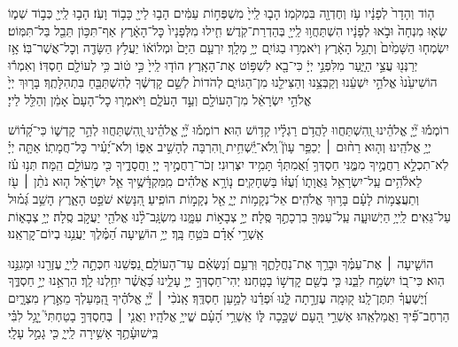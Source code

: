 ה֤וֹד וְהָדָר֙ לְפָנָ֔יו עֹ֥ז וְחֶדְוָ֖ה בִּמְקֹמֽוֹ׃
הָב֤וּ לַֽייָ֙ מִשְׁפְּח֣וֹת עַמִּ֔ים הָב֥וּ לַייָ֖ כָּב֥וֹד וָעֹֽז׃
הָב֥וּ לַֽייָ֖ כְּב֣וֹד שְׁמ֑וֹ שְׂא֤וּ מִנְחָה֙ וּבֹ֣אוּ לְפָנָ֔יו
הִשְׁתַּחֲו֥וּ לַֽייָ֖ בְּהַדְרַת־קֹֽדֶשׁ׃ חִ֤ילוּ מִלְּפָנָיו֙ כׇּל־הָאָ֔רֶץ
אַף־תִּכּ֥וֹן תֵּבֵ֖ל בַּל־תִּמּֽוֹט׃ יִשְׂמְח֤וּ הַשָּׁמַ֙יִם֙ וְתָגֵ֣ל הָאָ֔רֶץ
וְיֹאמְר֥וּ בַגּוֹיִ֖ם יְיָ֥ מָלָֽךְ׃ יִרְעַ֤ם הַיָּם֙ וּמְלוֹא֔וֹ
יַעֲלֹ֥ץ הַשָּׂדֶ֖ה וְכׇל־אֲשֶׁר־בּֽוֹ׃ אָ֥ז יְרַנְּנ֖וּ עֲצֵ֣י הַיָּ֑עַר
מִלִּפְנֵ֣י יְיָ֔ כִּי־בָ֖א לִשְׁפּ֥וֹט אֶת־הָאָֽרֶץ׃ הוֹד֤וּ לַֽייָ֙ כִּ֣י ט֔וֹב
כִּ֥י לְעוֹלָ֖ם חַסְדּֽוֹ׃ וְאִמְר֕וּ הוֹשִׁיעֵ֙נוּ֙ אֱלֹהֵ֣י יִשְׁעֵ֔נוּ
וְקַבְּצֵ֥נוּ וְהַצִּילֵ֖נוּ מִן־הַגּוֹיִ֑ם לְהֹדוֹת֙ לְשֵׁ֣ם קׇדְשֶׁ֔ךָ
לְהִשְׁתַּבֵּ֖חַ בִּתְהִלָּתֶֽךָ׃ בָּר֤וּךְ יְיָ֙ אֱלֹהֵ֣י יִשְׂרָאֵ֔ל
מִן־הָעוֹלָ֖ם וְעַ֣ד הָעֹלָ֑ם וַיֹּאמְר֤וּ כׇל־הָעָם֙ אָמֵ֔ן וְהַלֵּ֖ל לַייָ׃\\

\negline

%
רוֹמְמ֡וּ יְ֘יָ֤ אֱלֹהֵ֗ינוּ וְֽ֭הִשְׁתַּחֲווּ לַהֲדֹ֥ם רַגְלָ֗יו קָד֥וֹשׁ הֽוּא׃
רוֹמְמ֡וּ יְ֘יָ֤ אֱלֹהֵ֗ינוּ וְֽ֭הִשְׁתַּחֲווּ לְהַ֣ר קׇדְשׁ֑וֹ כִּי־קָ֝ד֗וֹשׁ יְיָ֥ אֱלֹהֵֽינוּ׃
%
וְה֤וּא רַח֨וּם ׀ יְכַפֵּ֥ר עָוֺן֮ וְֽלֹא־יַֽ֫שְׁחִ֥ית וְ֭הִרְבָּה לְהָשִׁ֣יב אַפּ֑וֹ
וְלֹא־יָ֝עִ֗יר כׇּל־חֲמָתֽוֹ׃
%
אַתָּ֤ה יְיָ֗ לֹֽא־תִכְלָ֣א רַחֲמֶ֣יךָ מִמֶּ֑נִּי חַסְדְּךָ֥ וַ֝אֲמִתְּךָ֗ תָּמִ֥יד יִצְּרֽוּנִי׃
זְכֹר־רַחֲמֶ֣יךָ יְיָ֭ וַחֲסָדֶ֑יךָ כִּ֖י מֵעוֹלָ֣ם הֵֽמָּה׃
תְּנ֥וּ עֹ֗ז לֵאלֹ֫הִ֥ים עַֽל־יִשְׂרָאֵ֥ל גַּאֲוָת֑וֹ וְ֝עֻזּ֗וֹ בַּשְּׁחָקִֽים׃
נ֤וֹרָ֥א אֱלֹהִ֗ים מִֽמִּקְדָּ֫שֶׁ֥יךָ אֵ֤ל יִשְׂרָאֵ֗ל
ה֤וּא נֹתֵ֨ן ׀ עֹ֖ז וְתַעֲצֻמ֥וֹת לָעָ֗ם בָּר֥וּךְ אֱלֹהִֽים׃
אֵל־נְקָמ֥וֹת יְיָ֑ אֵ֖ל נְקָמ֣וֹת הוֹפִֽיעַ׃
הִ֭נָּשֵׂא שֹׁפֵ֣ט הָאָ֑רֶץ הָשֵׁ֥ב גְּ֝מ֗וּל עַל־גֵּאִֽים׃
לַֽייָ֥ הַיְשׁוּעָ֑ה עַֽל־עַמְּךָ֖ בִרְכָתֶ֣ךָ סֶּֽלָה׃
 יְיָ֣ צְבָא֣וֹת עִמָּ֑נוּ מִשְׂגָּֽב־לָ֨נוּ אֱלֹהֵ֖י יַעֲקֹ֣ב סֶֽלָה׃
 יְיָ֥ צְבָא֑וֹת אַֽשְׁרֵ֥י אָ֝דָ֗ם בֹּטֵ֥חַ בָּֽךְ׃
 יְיָ֥ הוֹשִׁ֑יעָה הַ֝מֶּ֗לֶךְ יַעֲנֵ֥נוּ בְיוֹם־קׇרְאֵֽנוּ׃

הוֹשִׁ֤יעָה ׀ אֶת־עַמֶּ֗ךָ וּבָרֵ֥ךְ אֶת־נַחֲלָתֶ֑ךָ וּֽרְעֵ֥ם וְ֝נַשְּׂאֵ֗ם עַד־הָעוֹלָֽם׃
נַ֭פְשֵׁנוּ חִכְּתָ֣ה לַֽייָ֑ עֶזְרֵ֖נוּ וּמָגִנֵּ֣נוּ הֽוּא׃
כִּי־ב֭וֹ יִשְׂמַ֣ח לִבֵּ֑נוּ כִּ֤י בְשֵׁ֖ם קׇדְשׁ֣וֹ בָטָֽחְנוּ׃
יְהִי־חַסְדְּךָ֣ יְיָ֣ עָלֵ֑ינוּ כַּ֝אֲשֶׁ֗ר יִחַ֥לְנוּ לָֽךְ׃
הַרְאֵ֣נוּ יְיָ֣ חַסְדֶּ֑ךָ וְ֝יֶשְׁעֲךָ֗ תִּתֶּן־לָֽנוּ׃
ק֭וּמָֽה עֶזְרָ֣תָה לָּ֑נוּ וּ֝פְדֵ֗נוּ לְמַ֣עַן חַסְדֶּֽךָ׃
אָֽנֹכִ֨י ׀ יְ֘יָ֤ אֱלֹהֶ֗יךָ הַֽ֭מַּעַלְךָ מֵאֶ֣רֶץ מִצְרָ֑יִם הַרְחֶב־פִּ֗֝יךָ וַאֲמַלְאֵֽהוּ׃
אַשְׁרֵ֣י הָ֭עָם שֶׁכָּ֣כָה לּ֑וֹ אַֽשְׁרֵ֥י הָ֝עָ֗ם שֱׁייָ֥ אֱלֹהָֽיו׃
וַאֲנִ֤י ׀ בְּחַסְדְּךָ֣ בָטַחְתִּי֮ יָ֤גֵ֥ל לִבִּ֗י בִּֽישׁוּעָ֫תֶ֥ךָ אָשִׁ֥ירָה לַֽייָ֑ כִּ֖י גָמַ֣ל עָלָֽי׃


